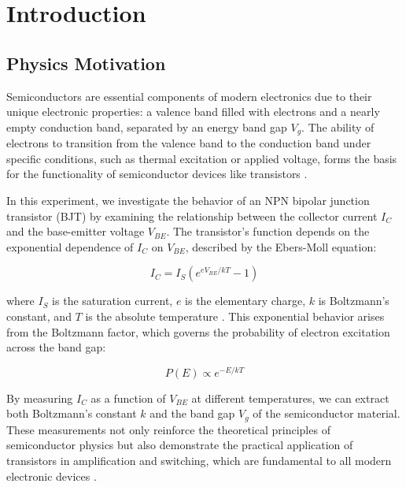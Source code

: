 \documentclass[12pt,letterpaper,twocolumn]{article}
\begin{document}

\section{Introduction}

\subsection{Physics Motivation}

Semiconductors are essential components of modern electronics due to their unique electronic properties: a valence band filled with electrons and a nearly empty conduction band, separated by an energy band gap \( V_g \). The ability of electrons to transition from the valence band to the conduction band under specific conditions, such as thermal excitation or applied voltage, forms the basis for the functionality of semiconductor devices like transistors \cite{Thornton}.

In this experiment, we investigate the behavior of an NPN bipolar junction transistor (BJT) by examining the relationship between the collector current \( I_C \) and the base-emitter voltage \( V_{BE} \). The transistor’s function depends on the exponential dependence of \( I_C \) on \( V_{BE} \), described by the Ebers-Moll equation:

\[
I_C = I_S \left(e^{eV_{BE}/kT} - 1\right)
\]

where \( I_S \) is the saturation current, \( e \) is the elementary charge, \( k \) is Boltzmann’s constant, and \( T \) is the absolute temperature \cite{Neudeck}. This exponential behavior arises from the Boltzmann factor, which governs the probability of electron excitation across the band gap:

\[
P(E) \propto e^{-E/kT}
\]

By measuring \( I_C \) as a function of \( V_{BE} \) at different temperatures, we can extract both Boltzmann’s constant \( k \) and the band gap \( V_g \) of the semiconductor material. These measurements not only reinforce the theoretical principles of semiconductor physics but also demonstrate the practical application of transistors in amplification and switching, which are fundamental to all modern electronic devices \cite{Thornton}.	
\end{document}
